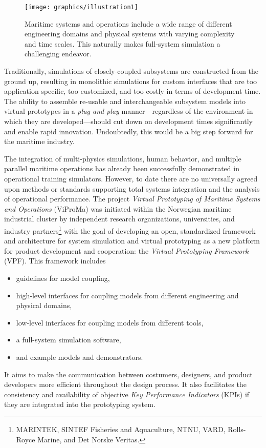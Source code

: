 \documentclass[prb,aps,showpacs,floatfix,twocolumn,10pt]{revtex4-1}
\newlength{\graphicswidth}
\theoremstyle{plain}
\theoremstyle{remark}
\begin{document}
\begin{figure}[htb]
	\texttt{[image: graphics/illustration1]}
	\caption{%
		Maritime systems and operations include a wide range of different engineering domains and physical systems with varying complexity and time scales.
		This naturally makes full-system simulation a challenging endeavor.
	}
	\label{fig:introduction_maritime_systems}
\end{figure}

Traditionally, simulations of closely-coupled subsystems are constructed from the ground up, resulting in monolithic simulations for custom interfaces that are too application specific, too customized, and too costly in terms of development time.
The ability to assemble re-usable and interchangeable subsystem models into virtual prototypes in a \emph{plug and play} manner---regardless of the environment in which they are developed---should cut down on development times significantly and enable rapid innovation.
Undoubtedly, this would be a big step forward for the maritime industry.

The integration of multi-physics simulations, human behavior, and multiple parallel maritime operations has already been successfully demonstrated in operational training simulators.\cite{Fossen2011}
However, to date there are no universally agreed upon methods or standards supporting total systems integration and the analysis of operational performance.
The project \emph{Virtual Prototyping of Maritime Systems and Operations}\cite{VIPROMA-website,Hassani2016} (ViProMa) was initiated within the Norwegian maritime industrial cluster by independent research organizations, universities, and industry partners\footnote{%
MARINTEK, SINTEF Fisheries and Aquaculture, NTNU, VARD, Rolls-Royce Marine, and Det Norske Veritas.
}
with the goal of developing an open, standardized framework and architecture for system simulation and virtual prototyping as a new platform for product development and cooperation: the \emph{Virtual Prototyping Framework} (VPF).
This framework includes
\begin{itemize}
	\item guidelines for model coupling,
	\item high-level interfaces for coupling models from different engineering and physical domains,
	\item low-level interfaces for coupling models from different tools,
	\item a full-system simulation software,
	\item and example models and demonstrators.
\end{itemize}
It aims to make the communication between costumers, designers, and product developers more efficient throughout the design process.
It also facilitates the consistency and availability of objective \emph{Key Performance Indicators} (KPIs) if they are integrated into the prototyping system.
\end{document}
